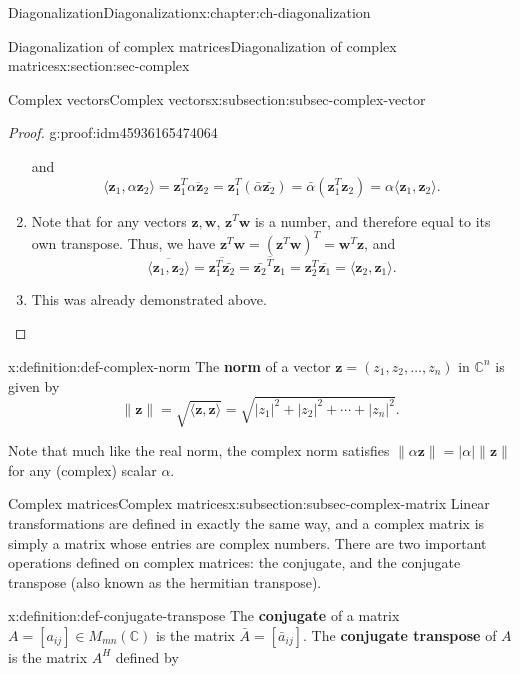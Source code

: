 \documentclass[oneside,10pt,]{book}
\newcommand{\terminology}[1]{\textbf{#1}}
\numberwithin{equation}{section}
\renewcommand{\C}{\mathbb{C}}
\newcommand{\len}[1]{\lVert #1\rVert}
\newcommand{\abs}[1]{\lvert #1\rvert}
\newcommand{\zz}{\mathbf{z}}
\newcommand{\ww}{\mathbf{w}}
\begin{document}
\begin{chapterptx}{Diagonalization}{}{Diagonalization}{}{}{x:chapter:ch-diagonalization}
\begin{sectionptx}{Diagonalization of complex matrices}{}{Diagonalization of complex matrices}{}{}{x:section:sec-complex}
\begin{subsectionptx}{Complex vectors}{}{Complex vectors}{}{}{x:subsection:subsec-complex-vector}
\begin{proof}{}{g:proof:idm45936165474064}
\begin{enumerate}
\begin{equation*}
\end{equation*}
and%
\begin{equation*}
\langle \zz_1,\alpha\zz_2\rangle = \zz_1^T\overline{\alpha \zz_2} = \zz_1^T(\bar{\alpha}\bar{\zz_2}) = \bar{\alpha}(\zz_1^T\zz_2)=\alpha\langle \zz_1,\zz_2\rangle\text{.}
\end{equation*}
%
\item{}Note that for any vectors \(\zz,\ww\), \(\zz^T\ww\) is a number, and therefore equal to its own transpose. Thus, we have \(\zz^T\ww = (\zz^T\ww)^T=\ww^T\zz\), and%
\begin{equation*}
\overline{\langle \zz_1,\zz_2\rangle} = \overline{\zz_1^T\bar{\zz_2}} = \overline{\bar{\zz_2}^T\zz_1} = \zz_2^T\overline{\zz_1}=\langle \zz_2,\zz_1\rangle\text{.}
\end{equation*}
%
\item{}This was already demonstrated above.%
\end{enumerate}
%
\end{proof}
\begin{definition}{}{x:definition:def-complex-norm}%
The \terminology{norm} of a vector \(\zz = (z_1,z_2,\ldots, z_n)\) in \(\C^n\) is given by%
\begin{equation*}
\len{\zz} = \sqrt{\langle \zz,\zz\rangle} = \sqrt{\abs{z_1}^2+\abs{z_2}^2+\cdots +\abs{z_n}^2}\text{.}
\end{equation*}
%
\end{definition}
Note that much like the real norm, the complex norm satisfies \(\len{\alpha\zz}=\abs{\alpha}\len{\zz}\) for any (complex) scalar \(\alpha\).%
\end{subsectionptx}
%
%
\typeout{************************************************}
\typeout{************************************************}
%
\begin{subsectionptx}{Complex matrices}{}{Complex matrices}{}{}{x:subsection:subsec-complex-matrix}
Linear transformations are defined in exactly the same way, and a complex matrix is simply a matrix whose entries are complex numbers. There are two important operations defined on complex matrices: the conjugate, and the conjugate transpose (also known as the hermitian transpose).%
\begin{definition}{}{x:definition:def-conjugate-transpose}%
The \terminology{conjugate} of a matrix \(A=[a_{ij}]\in M_{mn}(\C)\) is the matrix \(\bar{A}=[\bar{a}_{ij}]\). The \terminology{conjugate transpose} of \(A\) is the matrix \(A^H\) defined by%
\begin{equation*}

\end{equation*}
\end{definition}
\end{subsectionptx}
\end{sectionptx}
\end{chapterptx}
\end{document}

